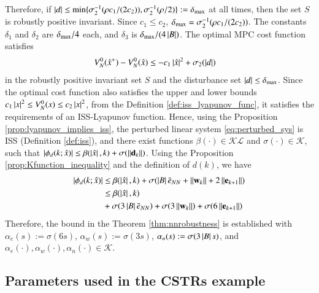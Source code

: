 \documentclass[preprint,5p, twocolumn, authoryear]{elsarticle}
\begin{document}
Therefore, if 
$\left| d \right| \leq \textnormal{min} \{ \sigma_2^{-1}(\rho c_1/(2c_2)), 
\sigma_2^{-1}(\rho/2)\} := \delta_{\textnormal{max}}$ 
at all times, then the set $S$ is 
robustly positive invariant. Since $c_1 \leq c_2$, 
$\delta_{\textnormal{max}} = \sigma_2^{-1}(\rho c_1/(2c_2))$.
The constants $\delta_1$ and $\delta_2$ are
$\delta_{\textnormal{max}}/4$ each, 
and $\delta_3$ is $\delta_{\textnormal{max}}/(4\left| B \right|)$.
The optimal MPC cost function satisfies
\begin{align*}
    V_N^0(\hat{x}^+) - V_N^0(\hat{x}) &\leq 
    -c_1\left| \hat{x} \right|^2 + \sigma_2(\left| d \right|)
\end{align*}
in the robustly positive invariant set $S$ and
the disturbance set $\left| d \right| \leq \delta_{\textnormal{max}}$.
Since the optimal cost function also satisfies the upper and lower bounds
$c_1\left| x \right|^2 \leq V_N^0(x) \leq c_2\left| x \right|^2$,
from the Definition \ref{def:iss_lyapunov_func},
it satisfies the requirements of an ISS-Lyapunov function.
Hence, using the Proposition \ref{prop:lyapunov_implies_iss}, 
the perturbed linear system \eqref{eq:perturbed_sys} is
ISS (Definition \ref{def:iss}), 
and there exist functions 
$\beta(\cdot) \in \mathcal{K}\mathcal{L}$ and 
$\sigma(\cdot) \in \mathcal{K}$, such that 
$\left| \phi_d(k; \hat{x}) \right| \leq \beta(\left| \hat{x} \right|, k) 
+ \sigma(\left| \left| \mathbf{d}_k \right| \right|)$. Using the Proposition
\ref{prop:Kfunction_inequality} and the definition of 
$d(k)$, we have 
\begin{align*}
    \left| \phi_d(k; \hat{x}) \right| & \leq \beta(\left| \hat{x} \right|, k)
    + \sigma(\left| B \right|\bar{e}_{NN} + \left| \left| \mathbf{w}_k \right| \right|
    + 2\left| \left| \mathbf{e}_{k+1} \right| \right|) \\
     & \leq \beta(\left| \hat{x} \right|, k) \\
    & +\sigma(3\left| B \right|\bar{e}_{NN}) + 
    \sigma(3\left| \left| \mathbf{w}_k \right| \right|)
    + \sigma(6\left| \left| \mathbf{e}_{k+1} \right| \right|)
\end{align*}
Therefore, the bound in the Theorem \ref{thm:nnrobustness} is established with 
$\alpha_e(s) := \sigma(6s)$, 
$\alpha_w(s) := \sigma(3s)$,
$\alpha_n(s) := \sigma(3\left| B \right| s)$, and 
$\alpha_e(\cdot), \alpha_w(\cdot), \alpha_n(\cdot) \in \mathcal{K}$.

\subsection{Parameters used in the CSTRs example} \label{app:cstrs_pars}
\end{document}
